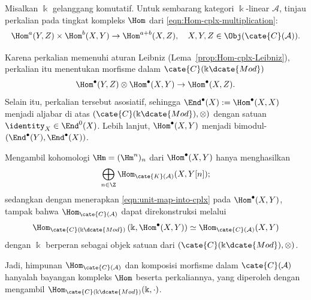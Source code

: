 \begin{example}\label{eg:k-linear-A-enrich}
	Misalkan $\Bbbk$ gelanggang komutatif. Untuk sembarang kategori
	$\Bbbk$-linear $\mathcal{A}$, tinjau perkalian pada tingkat kompleks
	$\Hom$ dari \eqref{eqn:Hom-cplx-multiplication}:
	\[ \Hom^a(Y, Z) \times \Hom^b(X, Y) \to \Hom^{a+b}(X, Z), \quad X, Y, Z \in \Obj(\cate{C}(\mathcal{A})). \]

	Karena perkalian memenuhi aturan Leibniz
	(Lema~\ref{prop:Hom-cplx-Leibniz}), perkalian itu menentukan morfisme dalam
	$\cate{C}(\Bbbk\dcate{Mod})$
	\[ \Hom^\bullet(Y, Z) \otimes \Hom^\bullet(X, Y) \to \Hom^\bullet(X, Z). \]
	Selain itu, perkalian tersebut asosiatif, sehingga
	$\End^\bullet(X):=\Hom^\bullet(X,X)$ menjadi aljabar di atas
	$(\cate{C}(\Bbbk\dcate{Mod}),\otimes)$ dengan satuan
	$\identity_X\in\End^0(X)$. Lebih lanjut, $\Hom^\bullet(X,Y)$ menjadi
	bimodul-$(\End^\bullet(Y),\End^\bullet(X))$.

	Mengambil kohomologi $\Hm=(\Hm^n)_n$ dari $\Hom^\bullet(X,Y)$ hanya
	menghasilkan
	\[ \bigoplus_{n \in \Z} \Hom_{\cate{K}(\mathcal{A})}(X, Y[n]); \]
	sedangkan dengan menerapkan \eqref{eqn:unit-map-into-cplx} pada
	$\Hom^\bullet(X,Y)$, tampak bahwa $\Hom_{\cate{C}(\mathcal{A})}$ dapat
	direkonstruksi melalui
	\[ \Hom_{\cate{C}(\Bbbk\dcate{Mod})}\left( \Bbbk, \Hom^\bullet(X, Y) \right) \simeq \Hom_{\cate{C}(\mathcal{A})}(X, Y)  \]
	dengan $\Bbbk$ berperan sebagai objek satuan dari
	$(\cate{C}(\Bbbk\dcate{Mod}),\otimes)$.
\end{example}

Jadi, himpunan $\Hom_{\cate{C}(\mathcal{A})}$ dan komposisi morfisme dalam
$\cate{C}(\mathcal{A})$ hanyalah bayangan kompleks $\Hom$ beserta
perkaliannya, yang diperoleh dengan mengambil
$\Hom_{\cate{C}(\Bbbk\dcate{Mod})}(\Bbbk,\mathord\cdot)$.

